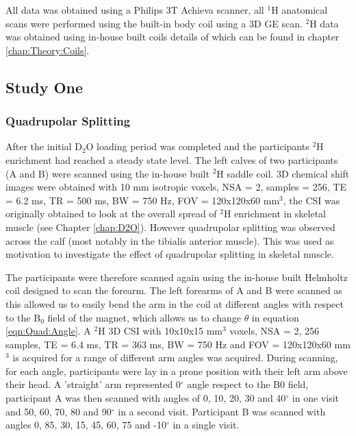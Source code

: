 \documentclass[class=article, crop=false]{standalone}
\begin{document}
All data was obtained using a Philips 3T Achieva scanner, all $^1$H anatomical scans were performed using the built-in body coil using a 3D GE scan. $^2$H data was obtained using in-house built coils details of which can be found in chapter \ref{chap:Theory:Coils}. 

\subsection{Study One}
\subsubsection{Quadrupolar Splitting}
\label{Chap:Quad:1:Split}

After the initial D$_2$O loading period was completed and the participants $^2$H enrichment had reached a steady state level. The left calves of two participants (A and B) were scanned using the in-house built $^2$H saddle coil. 3D chemical shift images were obtained with 10 mm isotropic voxels, NSA = 2, samples = 256, TE = 6.2 ms, TR = 500 ms, BW = 750 Hz, FOV = 120x120x60 mm$^3$, the CSI was originally obtained to look at the overall spread of $^2$H enrichment in skeletal muscle (see Chapter \ref{chap:D2O}). However quadrupolar splitting was observed across the calf (most notably in the tibialis anterior muscle). This was used as motivation to investigate the effect of quadrupolar splitting in skeletal muscle.

The participants were therefore scanned again using the in-house built Helmholtz coil designed to scan the forearm. The left forearms of A and B were scanned as this allowed us to easily bend the arm in the coil at different angles with respect to the B$_0$ field of the magnet, which allows us to change $\theta$ in equation \ref{eqn:Quad:Angle}. A $^2$H 3D CSI with 10x10x15 mm$^3$ voxels, NSA = 2, 256 samples, TE = 6.4 ms, TR = 363 ms, BW = 750 Hz and FOV = 120x120x60 mm$^3$ is acquired for a range of different arm angles was acquired. During scanning, for each angle, participants were lay in a prone position with their left arm above their head. A 'straight' arm represented  0$^{\circ}$ angle respect to the B0 field, participant A was then scanned with angles of 0, 10, 20, 30 and 40$^{\circ}$ in one visit and 50, 60, 70, 80 and 90$^{\circ}$ in a second visit. Participant B was scanned with angles 0, 85, 30, 15, 45, 60, 75 and -10$^{\circ}$ in a single visit. 
\end{document}
